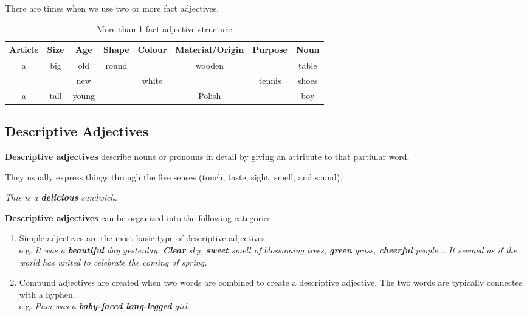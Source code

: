 \documentclass[hidelinks,10pt,a4paper]{article}
\begin{document}
There are times when we use two or more fact adjectives.

\begin{table}[h]
\begin{center}
\begin{tabular}{|c|c|c|c|c|c|c|c|}
	\hline
	\textbf{Article} & \textbf{Size} & \textbf{Age} & \textbf{Shape} & \textbf{Colour} & \textbf{Material/Origin} & \textbf{Purpose} & \textbf{Noun} \\ \hline
	a & big & old & round & & wooden & & table \\ \hline
	  & & new &  & white & & tennis & shoes \\ \hline
	a & tall & young & & & Polish & & boy \\ \hline
\end{tabular}
\end{center}
\caption{More than 1 fact adjective structure} \label{tab:adj2}
\end{table}

\subsection{Descriptive Adjectives}
\textbf{Descriptive adjectives} describe nouns or pronouns in detail by giving an attribute to that partiular word.

They usually express things through the five senses (touch, taste, sight, smell, and sound).

\begin{center}
	\textit{This is a \textbf{delicious} sandwich.}
\end{center}

\textbf{Descriptive adjectives} can be organized into the following categories:

\begin{enumerate}[label=(\alph*)]
	\item Simple adjectives are the most basic type of descriptive adjectives \\
		e.g. \textit{It was a \textbf{beautiful} day yesterday. \textbf{Clear} sky, \textbf{sweet} smell of blossoming trees, \textbf{green} grass, \textbf{cheerful} people... It seemed as if the world has united to celebrate the coming of spring.}
	\item Compund adjectives are created when two words are combined to create a descriptive adjective. The two words are typically connectes with a hyphen. \\
		e.g. \textit{Pam was a \textbf{baby-faced long-legged} girl.}
\end{enumerate}
\end{document}
